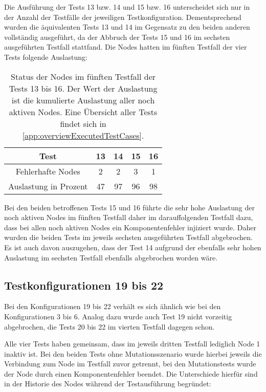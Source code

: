 Die Ausführung der Tests 13 bzw. 14 und 15 bzw. 16 unterscheidet sich nur in der Anzahl der Testfälle der jeweiligen Testkonfiguration.
Dementsprechend wurden die äquivalenten Tests 13 und 14 im Gegensatz zu den beiden anderen vollständig ausgeführt, da der Abbruch der Tests 15 und 16 im sechsten ausgeführten Testfall stattfand.
Die Nodes hatten im fünften Testfall der vier Tests folgende Auslastung:

\begin{table}[h]
    \begin{tabular}{c|cccc}
    	        Test          & 13 & 14 & 15 & 16 \\ \hline
    	  Fehlerhafte Nodes   & 2  & 2  & 3  & 1  \\
    	Auslastung in Prozent & 47 & 97 & 96 & 98
    \end{tabular}
    \caption[Status der Nodes im fünften Testfall der Tests 13 bis 16]
    {Status der Nodes im fünften Testfall der Tests 13 bis 16.
    Der Wert der Auslastung ist die kumulierte Auslastung aller noch aktiven Nodes.
    Eine Übersicht aller Tests findet sich in \cref{app:overviewExecutedTestCases}.}
    \label{tab:loadTests1316}
\end{table}

Bei den beiden betroffenen Tests 15 und 16 führte die sehr hohe Auslastung der noch aktiven Nodes im fünften Testfall daher im darauffolgenden Testfall dazu, dass bei allen noch aktiven Nodes ein Komponentenfehler injiziert wurde.
Daher wurden die beiden Tests im jeweils sechsten ausgeführten Testfall abgebrochen.
Es ist auch davon auszugehen, dass der Test 14 aufgrund der ebenfalls sehr hohen Auslastung im sechsten Testfall ebenfalls abgebrochen worden wäre.

\subsection{Testkonfigurationen 19 bis 22}
\label{subsec:noReconf1922}

Bei den Konfigurationen 19 bis 22 verhält es sich ähnlich wie bei den Konfigurationen 3 bis 6.
Analog dazu wurde auch Test 19 nicht vorzeitig abgebrochen, die Tests 20 bis 22 im vierten Testfall dagegen schon.

Alle vier Tests haben gemeinsam, dass im jeweils dritten Testfall lediglich Node 1 inaktiv ist.
Bei den beiden Tests ohne Mutationsszenario wurde hierbei jeweils die Verbindung zum Node im Testfall zuvor getrennt, bei den Mutationstests wurde der Node durch einen Komponentenfehler beendet.
Die Unterschiede hierfür sind in der Historie des Nodes während der Testausführung begründet:

